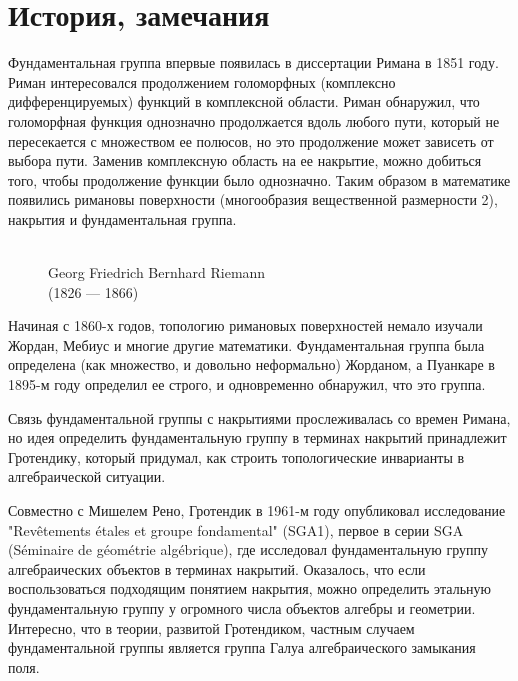 \documentclass[12pt]{book}
\theoremstyle{upshape}
\theoremstyle{generic}
\theoremstyle{upshapenonumber}
\newcommand{\следствие}{%
     \refstepcounter{teorema}
     {\noindent\bf Следствие \thechapter.\arabic{teorema}:\ }}
\newcommand{\пример}{%
     \refstepcounter{teorema}
     {\noindent\bf Пример \thechapter.\arabic{teorema}:\ }}
\newcommand{\лемма}{%
     \refstepcounter{teorema}
     {\noindent\bf Лемма \thechapter.\arabic{teorema}:\ }}
\newcommand{\теорема}{%
     \refstepcounter{teorema}
     {\noindent\bf Теорема \thechapter.\arabic{teorema}:\ }}
\newcommand{\утверждение}{%
     \refstepcounter{teorema}
     {\noindent\bf Утверждение \thechapter.\arabic{teorema}:\ }}
\begin{document}

\section{История, замечания}


Фундаментальная группа впервые появилась в диссертации
Римана в 1851 году. Риман интересовался продолжением голоморфных
(комплексно дифференцируемых) функций в комплексной области.
Риман обнаружил, что голоморфная функция однозначно продолжается
вдоль любого пути, который не пересекается с множеством
ее полюсов, но это продолжение может зависеть от 
выбора пути. Заменив комплексную область на ее накрытие,
можно добиться того, чтобы продолжение функции
было однозначно. Таким образом в математике
появились римановы поверхности (многообразия
вещественной размерности 2), накрытия
и фундаментальная группа.

\begin{figure}[ht]
\begin{center}
\\
{Georg Friedrich Bernhard Riemann\\
(1826 --- 1866)}
\end{center}
\end{figure}

Начиная с 1860-х годов, топологию римановых
поверхностей немало изучали Жордан, Мебиус и многие 
другие математики. Фундаментальная группа была определена
(как множество, и довольно неформально) Жорданом, 
а Пуанкаре в 1895-м году определил ее строго, и 
одновременно обнаружил, что это группа.

Связь фундаментальной группы с накрытиями 
прослеживалась со времен Римана, но идея
определить фундаментальную группу в терминах
накрытий принадлежит Гротендику, который 
придумал, как строить топологические
инварианты в алгебраической ситуации.

Совместно с Мишелем Рено, Гротендик в 1961-м году
опубликовал исследование "Rev\^etements \'etales et 
groupe fondamental" (SGA1), первое в серии SGA
(S\'eminaire de g\'eom\'etrie alg\'ebrique), где
исследовал фундаментальную группу алгебраических
объектов в терминах накрытий. Оказалось, что
если воспользоваться подходящим понятием накрытия, 
можно определить этальную фундаментальную группу у огромного 
числа объектов алгебры и геометрии. Интересно,
что в теории, развитой Гротендиком, частным случаем
фундаментальной группы является группа
Галуа алгебраического замыкания поля.
\end{document}
